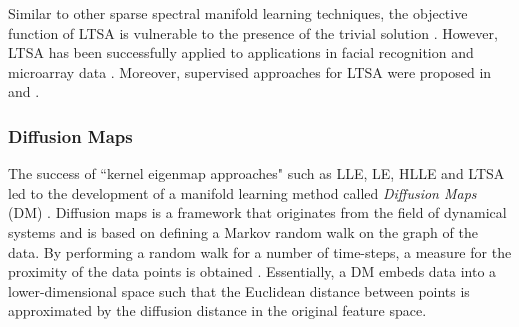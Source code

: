 

Similar to other sparse spectral manifold learning techniques, the objective function of LTSA is vulnerable to the presence of the trivial solution \citep{VanDerMaaten2009DRReview}.  However, LTSA has been successfully applied to applications in facial recognition \citep{Zhang2007LTSAFaceRecognition} and microarray data \citep{VanDerMaaten2009DRReview}.  Moreover, supervised approaches for LTSA were proposed in \citep{Li2005SupervisedLTSA} and \citep{Ma2010SupervisedLTTSA}.


\subsubsection{Diffusion Maps} \label{sec:Diffusion_Maps}
The success of ``kernel eigenmap approaches" such as LLE, LE, HLLE and LTSA led to the development of a manifold learning method called \textit{Diffusion Maps} (DM) \citep{Coifman2006DiffusionMaps}.  Diffusion maps is a framework that originates from the field of dynamical systems and is based on defining a Markov random walk on the graph of the data.  By performing a random walk for a number of time-steps, a measure for the proximity of the data points is obtained \citep{VanDerMaaten2009DRReview}. Essentially, a DM embeds data into a lower-dimensional space such that the Euclidean distance between points is approximated by the diffusion distance in the original feature space.

